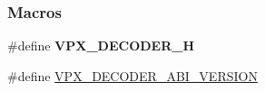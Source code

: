 \subsubsection*{Macros}
\begin{DoxyCompactItemize}
\item 
\hypertarget{group__decoder_gae9d9e73841dd64cb26053738963e7e69}{\#define {\bfseries V\-P\-X\-\_\-\-D\-E\-C\-O\-D\-E\-R\-\_\-\-H}}\label{group__decoder_gae9d9e73841dd64cb26053738963e7e69}

\item 
\hypertarget{group__decoder_ga462b459e7ae13937e1eae1776245db12}{\#define \hyperlink{group__decoder_ga462b459e7ae13937e1eae1776245db12}{V\-P\-X\-\_\-\-D\-E\-C\-O\-D\-E\-R\-\_\-\-A\-B\-I\-\_\-\-V\-E\-R\-S\-I\-O\-N}}\label{group__decoder_ga462b459e7ae13937e1eae1776245db12}


\end{DoxyCompactItemize}
